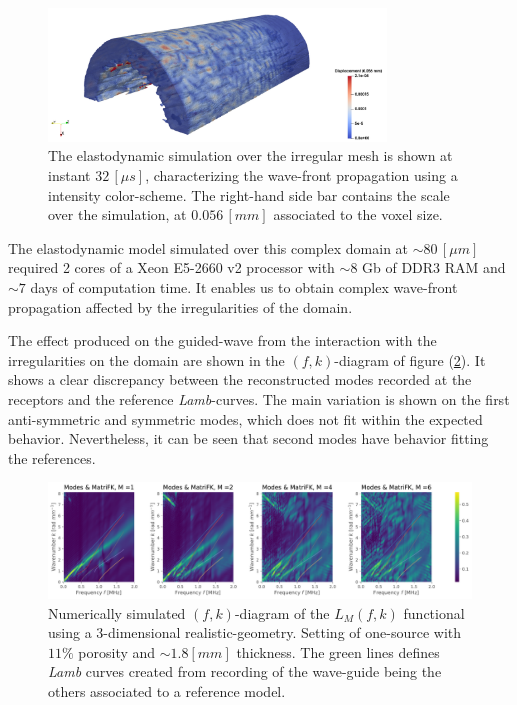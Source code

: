 \begin{figure}[!h]
	\centering
	\includegraphics[width=0.8\textwidth]{images/ImgExt/Cortical3dsc04Mesh1000Fill-T80.png}
	\caption{The elastodynamic simulation over the irregular mesh is shown at instant $32 \, [\mu s]$, characterizing the wave-front propagation using a intensity color-scheme. The right-hand side bar contains the scale over the simulation, at $0.056 \, [mm]$ associated to the voxel size.}
	\label{HomBone-TimeStep}
\end{figure} 

\begin{rem}
The elastodynamic model simulated over this complex domain at $\sim 80 \, [\mu m]$ required 2 cores of a Xeon E5-2660 v2 processor with $\sim 8$ Gb of DDR3 RAM and $\sim 7$ days of computation time. It enables us to obtain complex wave-front propagation affected by the irregularities of the domain.
\end{rem}

The effect produced on the guided-wave from the interaction with the irregularities on the domain are shown in the $(f,k)$-diagram of figure (\ref{FK-HomBone-DiagramS1P11M18}). It shows a clear discrepancy between the reconstructed modes recorded at the receptors and the reference \textit{Lamb}-curves. The main variation is shown on the first anti-symmetric and symmetric modes, which does not fit within the expected behavior. Nevertheless, it can be seen that second modes have behavior fitting the references.  
\begin{figure}[!h]
	\centering
	\includegraphics[width=\textwidth]{images/ClusterSim/3DCorticalS1000TimeP11TransIsoFKW18.pdf}
	\caption{Numerically simulated $(f,k)$-diagram  of the $L_M(f,k)$ functional using a 3-dimensional realistic-geometry. Setting of one-source with $11\%$ porosity and $\sim 1.8 [mm]$ thickness. The green lines defines \textit{Lamb} curves created from recording of the wave-guide being the others associated to a reference model.}
	\label{FK-HomBone-DiagramS1P11M18}
\end{figure} 


